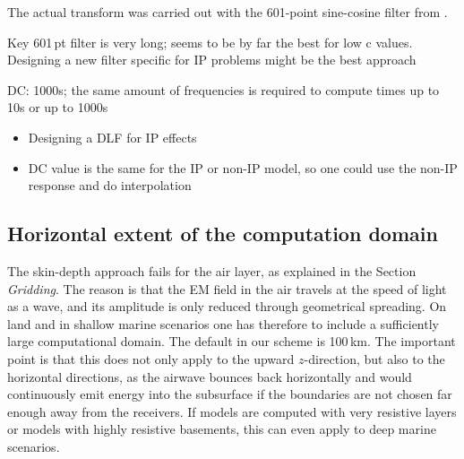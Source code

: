 \documentclass[extra, camera,%
    onecolumn,   %
    referee,     %
]{gji}
\begin{document}



The actual transform was carried out with the 601-point sine-cosine filter from
\cite{GEO.09.Key}.


Key 601\,pt filter is very long; seems to be by far the best for low c values.
Designing a new filter specific for IP problems might be the best approach

DC: 1000s; the same amount of frequencies is required to compute times up to
10s or up to 1000s

\cite{GJI.17.Commer}

\begin{itemize}
  \item Designing a DLF for IP effects
  \item DC value is the same for the IP or non-IP model, so one could use
    the non-IP response and do interpolation
\end{itemize}



\subsection{Horizontal extent of the computation domain}  %

The skin-depth approach fails for the air layer, as explained in the Section
\emph{Gridding}. The reason is that the EM field in the air travels at the
speed of light as a wave, and its amplitude is only reduced through geometrical
spreading. On land and in shallow marine scenarios one has therefore to include
a sufficiently large computational domain. The default in our scheme is
100\,km. The important point is that this does not only apply to the upward
$z$-direction, but also to the horizontal directions, as the airwave bounces
back horizontally and would continuously emit energy into the subsurface if the
boundaries are not chosen far enough away from the receivers. If models are
computed with very resistive layers or models with highly resistive basements,
this can even apply to deep marine scenarios.
\end{document}
